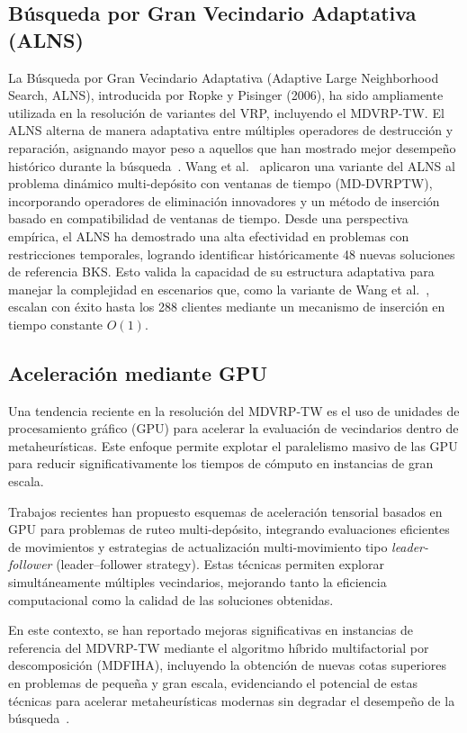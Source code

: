 \documentclass[letter, 10pt, dvipdfmx]{article}
\begin{document}
\subsection{Búsqueda por Gran Vecindario Adaptativa (ALNS)}

La Búsqueda por Gran Vecindario Adaptativa (Adaptive Large Neighborhood Search, ALNS), introducida por Ropke
y Pisinger (2006), ha sido ampliamente utilizada en la resolución de variantes del VRP, incluyendo el MDVRP-TW.
El ALNS alterna de manera adaptativa entre múltiples operadores de destrucción y reparación, asignando mayor
peso a aquellos que han mostrado mejor desempeño histórico durante la búsqueda~\cite{ALNS2024}.
Wang et al.~\cite{Wang2024} aplicaron una variante del ALNS al problema dinámico multi-depósito con
ventanas de tiempo (MD-DVRPTW), incorporando operadores de eliminación innovadores y un método de inserción
basado en compatibilidad de ventanas de tiempo.
Desde una perspectiva empírica, el ALNS ha demostrado una alta efectividad en
problemas con restricciones temporales, logrando identificar históricamente 48 nuevas
soluciones de referencia BKS. Esto valida la capacidad de su estructura adaptativa para manejar
la complejidad en escenarios que, como la variante de Wang et al.~\cite{Wang2024}, escalan
con éxito hasta los 288 clientes mediante un mecanismo de inserción en tiempo constante $O(1)$.

\subsection{Aceleración mediante GPU}

Una tendencia reciente en la resolución del MDVRP-TW es el uso de unidades de procesamiento gráfico (GPU)
para acelerar la evaluación de vecindarios dentro de metaheurísticas. Este enfoque permite explotar el
paralelismo masivo de las GPU para reducir significativamente los tiempos de cómputo en instancias de gran
escala.

Trabajos recientes han propuesto esquemas de aceleración tensorial basados en GPU para problemas de ruteo
multi-depósito, integrando evaluaciones eficientes de movimientos y estrategias de actualización
multi-movimiento tipo \textit{leader-follower} (leader–follower strategy). Estas técnicas permiten explorar
simultáneamente múltiples vecindarios, mejorando tanto la eficiencia computacional como la calidad de las
soluciones obtenidas.

En este contexto, se han reportado mejoras significativas en instancias de referencia del MDVRP-TW
mediante el algoritmo híbrido multifactorial por descomposición (MDFIHA),
incluyendo la obtención de nuevas cotas superiores en problemas de pequeña y gran escala, evidenciando el
potencial de estas técnicas para acelerar metaheurísticas modernas sin degradar el desempeño de la búsqueda~\cite{GPU2026}.
\end{document}
